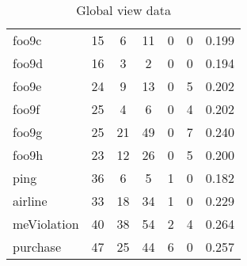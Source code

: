 \begin{table}[h]
\begin{tabular}{lccc}
foo9c & 15 & 6 & 11 & 0 & 0 & 0.199 \\ 
foo9d & 16 & 3 & 2 & 0 & 0 & 0.194 \\ 
foo9e & 24 & 9 & 13 & 0 & 5 & 0.202 \\ 
foo9f & 25 & 4 & 6 & 0 & 4 & 0.202 \\ 
foo9g & 25 & 21 & 49 & 0 & 7 & 0.240 \\ 
foo9h & 23 & 12 & 26 & 0 & 5 & 0.200 \\ 
ping & 36 & 6 & 5 & 1 & 0 & 0.182 \\ 
airline & 33 & 18 & 34 & 1 & 0 & 0.229 \\ 
meViolation & 40 & 38 & 54 & 2 & 4 & 0.264 \\ 
purchase & 47 & 25 & 44 & 6 & 0 & 0.257 \\ 
\hline
\end{tabular}
\caption{Global view data}
\end{table}